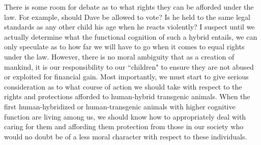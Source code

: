 \documentclass[letterpaper,10pt,twoside]{article}
\begin{document}
There is some room for debate as to what rights they can be afforded under the law.  For example, should Dave be allowed to vote?  Is he held to the same legal standards as any other child his age when he reacts violently?  I suspect until we actually determine what the functional cognition of such a hybrid entails, we can only speculate as to how far we will have to go when it comes to equal rights under the law.  However, there is no moral ambiguity that as a creation of mankind, it is our responsibility to our ``children" to ensure they are not abused or exploited for financial gain.  Most importantly, we must start to give serious consideration as to what course of action we should take with respect to the rights and protections afforded to human-hybrid transgenic animals.  When the first human-hybridized or human-transgenic animals with higher cognitive function are living among us, we should know how to appropriately deal with caring for them and affording them protection from those in our society who would no doubt be of a less moral character with respect to these individuals.
\end{document}
